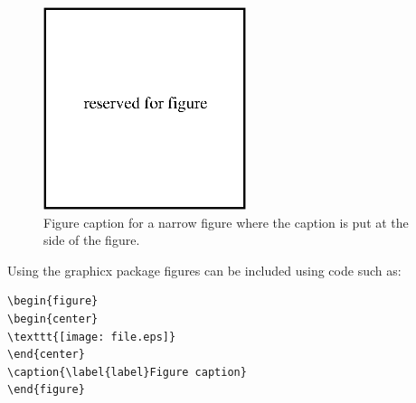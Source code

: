 \documentclass[a4paper]{jpconf}
\begin{document}
\begin{figure}[h]
\includegraphics[width=14pc]{name.eps}\hspace{2pc}%
\begin{minipage}[b]{14pc}\caption{\label{label}Figure caption for a narrow figure where the caption is put at the side of the figure.}
\end{minipage}
\end{figure}

Using the graphicx package figures can be included using code such as:
\begin{verbatim}
\begin{figure}
\begin{center}
\texttt{[image: file.eps]}
\end{center}
\caption{\label{label}Figure caption}
\end{figure}
\end{verbatim}
\end{document}
